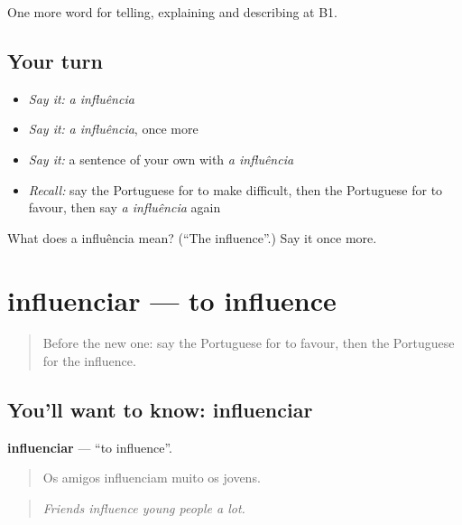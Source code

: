 \begin{grammarlens}[title={What you've built}]
One more word for telling, explaining and describing at B1.
\end{grammarlens}

\subsection*{Your turn}
\begin{itemize}
\raggedright
  \item \emph{Say it:} \emph{a influência}
  \item \emph{Say it:} \emph{a influência}, once more
  \item \emph{Say it:} a sentence of your own with \emph{a influência}
  \item \emph{Recall:} say the Portuguese for to make difficult, then the Portuguese for to favour, then say \emph{a influência} again
\end{itemize}

\begin{tcolorbox}[breakable,colback=teal!4,colframe=teal!35!black,title={Before you move on}]
What does a influência mean? (\textquotedblleft{}The influence\textquotedblright{}.) Say it once more.
\end{tcolorbox}
\section[influenciar]{influenciar — to influence}

\label{lesson:PT-C354-influenciar}



\begin{quote}
Before the new one: say the Portuguese for to favour, then the Portuguese for the influence.
\end{quote}

\subsection*{You'll want to know: influenciar}
\textbf{influenciar} — \textquotedblleft{}to influence\textquotedblright{}.

\begin{quote}
Os amigos influenciam muito os jovens.
\end{quote}

\begin{quote}
\emph{Friends influence young people a lot.}
\end{quote}

